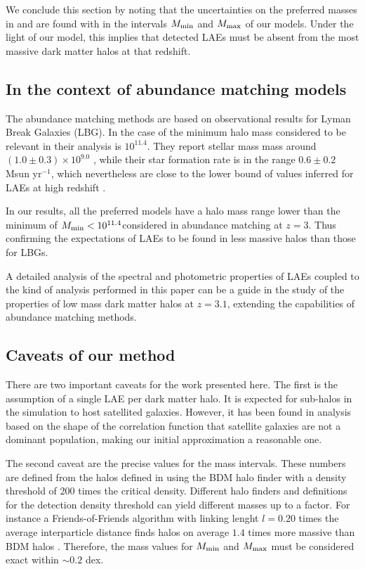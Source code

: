 \documentclass[usenatbib]{mn2e}
\newcommand{\hMsun}{{\ifmmode{h^{-1}{\rm
        {M_{\odot}}}}\else{$h^{-1}{\rm{M_{\odot}}}$}\fi}}
\begin{document}
We conclude this section by noting that the uncertainties on
the preferred masses in \citep{Gawiser07} and \cite{Ouchi2010} are
found with in the intervals $M_{\rm min}$ and $M_{\rm max}$ of our
models. Under the light of our model, this implies that detected LAEs
must be absent from the most massive dark matter halos at that
redshift.



\subsection{In the context of abundance matching models}


The abundance matching methods are based on observational results for Lyman Break Galaxies
\citep{Behroozi2013a,Behroozi2013b}  (LBG).  In the case of
\cite{Behroozi2013a} the minimum halo mass considered to be relevant
in their analysis is $10^{11.4}$\hMsun. They report  stellar mass mass
around $(1.0\pm0.3)\times 10^{9.0}$ \hMsun, while their star formation
rate is in the range $0.6\pm 0.2$ Msun yr$^{-1}$, which nevertheless
are close to the lower bound of values inferred for LAEs at high
redshift \citep{Gawiser2007,Nilsson2009,Pentericci2009}.

In our results, all the preferred models have a halo mass range lower
than the minimum of $M_{\rm min}<10^{11.4}$\hMsun considered in
abundance matching at $z=3$. Thus confirming the expectations of LAEs
to be found in less massive halos than those for LBGs.

A detailed analysis of the spectral and photometric properties of LAEs
coupled to the kind of analysis performed in this paper can be a guide
in the study of the properties of low mass dark matter halos at
$z=3.1$, extending the capabilities of abundance matching methods.

\subsection{Caveats of our method}

There are two important caveats for the work presented here. The first is the
assumption of a single LAE per dark matter halo. It is expected
for sub-halos in the simulation to host satellited galaxies. However,
it has been found in analysis based on the shape of the correlation
function \citep{Jose2013b} that satellite galaxies are not a dominant
population, making our initial approximation a reasonable one.


The second caveat are the precise values for the mass intervals. These
numbers are defined from the halos defined in using the BDM halo
finder with a density threshold of 200 times the critical
density. Different halo finders and definitions for the detection
density threshold can yield different masses up to a factor. For
instance a Friends-of-Friends algorithm with linking lenght $l=0.20$
times the average interparticle distance finds halos on average $1.4$
times more massive than BDM halos \citep{Bolshoi}. Therefore, the mass
values for $M_{\rm min}$ and $M_{\rm max}$ must be considered exact
within $\sim 0.2$ dex.
\end{document}
